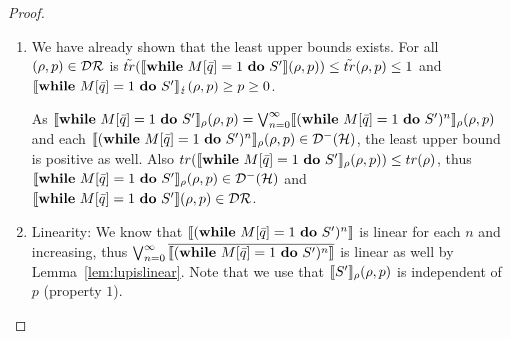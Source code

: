 \documentclass[a4paper,UKenglish,cleveref, autoref, thm-restate]{lipics-v2021}
\begin{document}
\begin{proof}
\begin{itemize}
\begin{enumerate}
            \item We have already shown that the least upper bounds exists. For all $(\rho,p)\in \densityNumberPairs$ is
            $\tilde{tr}(\semantics{\while'}(\rho,p))\leq \tilde{tr}(\rho,p)\leq 1$ and $\semanticsErr{\while'}(\rho,p) \geq p \geq 0$.

            As $\semanticsRho{\while'}(\rho,p) = \bigvee_{n=0}^\infty \semanticsRho{(\while')^n} (\rho,p)$ and each $\semanticsRho{(\while')^n} (\rho,p) \in \density$, the least upper bound is positive as well. Also $tr(\semanticsRho{\while'}(\rho,p)) \leq tr(\rho)$, thus $\semanticsRho{\while'}(\rho,p) \in \density$ and $\semantics{\while'}(\rho,p) \in \densityNumberPairs$.

            \item Linearity:
            We know that $\semantics{(\while')^n}$ is linear for each $n$ and increasing, thus $\bigvee_{n=0}^\infty \overline{\semantics{(\while')^n}}$ is linear as well by Lemma~\ref{lem:lupislinear}. Note that we use that $\semanticsRho{S'}(\rho,p)$ is independent of $p$ (property $1$).
        \end{enumerate}
    \end{itemize}
\end{proof}
\end{document}
